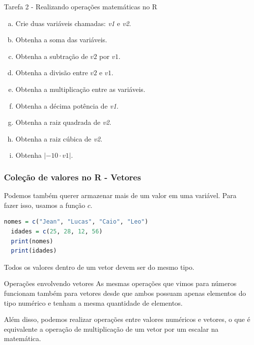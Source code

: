 \documentclass{beamer}
\begin{document}
\begin{frame}{Tarefa 2 - Realizando operações matemáticas no R}
  \begin{exercicio}
    \begin{enumerate}[a)]
      \item Crie duas variáveis chamadas: \textit{v1} e  \textit{v2}.
      \item Obtenha a soma das variáveis.
      \item Obtenha a subtração de $v2$ por $v1$.
      \item Obtenha a divisão entre $v2$ e $v1$.
      \item Obtenha a multiplicação entre as variáveis.
      \item Obtenha a décima potência de \textit{v1}.
      \item Obtenha a raiz quadrada de \textit{v2}.
      \item Obtenha a raiz cúbica de \textit{v2}.
      \item Obtenha  $|-10 \cdot v1|$.
    \end{enumerate}
  \end{exercicio}
\end{frame}

\begin{frame}[fragile]
  \frametitle{Coleção de valores no R - Vetores}

  Podemos também querer armazenar mais de um valor em uma variável. Para fazer isso, 
  usamos a função $c$. 

  \begin{lstlisting}[language=R]
  nomes = c("Jean", "Lucas", "Caio", "Leo")
  idades = c(25, 28, 12, 56)
  print(nomes)
  print(idades)
  \end{lstlisting}
  
  \begin{atencao}
    Todos os valores dentro de um vetor devem ser do mesmo tipo. 
  \end{atencao}
  
\end{frame}

\begin{frame}{Operações envolvendo vetores}
  As mesmas operações que vimos para números funcionam também para vetores desde que ambos 
  possuam apenas elementos do tipo numérico e tenham a mesma quantidade de elementos.
  
  \pause
  \vspace{5px}

  Além disso, podemos realizar operações entre valores numéricos e vetores, o que é equivalente 
  a operação de multiplicação de um vetor por um escalar na matemática. 
  
\end{frame}
\end{document}
